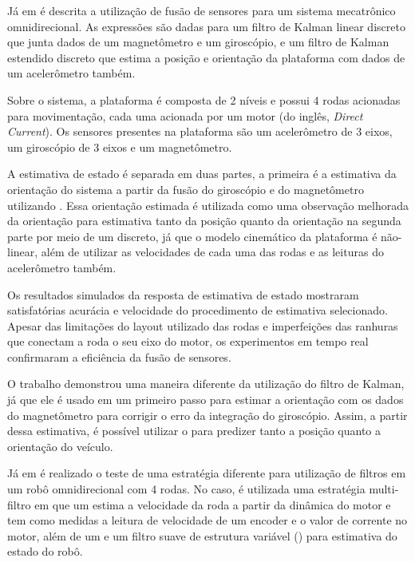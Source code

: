 \documentclass[acronym, symbols, table, deposito]{fei}
\begin{document}
Já em \textcite{korotaj2021kalman} é descrita a utilização de fusão de sensores para um sistema mecatrônico omnidirecional. As expressões são dadas para um filtro de Kalman linear discreto que junta dados de um magnetômetro e um giroscópio, e um filtro de Kalman estendido discreto que estima a posição e orientação da plataforma com dados de um acelerômetro também.

Sobre o sistema, a plataforma é composta de 2 níveis e possui 4 rodas acionadas para movimentação, cada uma acionada por um motor  (do inglês, \textit{Direct Current}). Os sensores presentes na plataforma são um acelerômetro de 3 eixos, um giroscópio de 3 eixos e um magnetômetro.

A estimativa de estado é separada em duas partes, a primeira é a estimativa da orientação do sistema a partir da fusão do giroscópio e do magnetômetro utilizando . Essa orientação estimada é utilizada como uma observação melhorada da orientação para estimativa tanto da posição quanto da orientação na segunda parte por meio de um  discreto, já que o modelo cinemático da plataforma é não-linear, além de utilizar as velocidades de cada uma das rodas e as leituras do acelerômetro também.

Os resultados simulados da resposta de estimativa de estado mostraram satisfatórias acurácia e velocidade do procedimento de estimativa selecionado. Apesar das limitações do layout utilizado das rodas e imperfeições das ranhuras que conectam a roda o seu eixo do motor, os experimentos em tempo real confirmaram a eficiência da fusão de sensores.

O trabalho demonstrou uma maneira diferente da utilização do filtro de Kalman, já que ele é usado em um primeiro passo para estimar a orientação com os dados do magnetômetro para corrigir o erro da integração do giroscópio. Assim, a partir dessa estimativa, é possível utilizar o  para predizer tanto a posição quanto a orientação do veículo.


Já em \textcite{9233826} é realizado o teste de uma estratégia diferente para utilização de filtros em um robô omnidirecional com 4 rodas. No caso, é utilizada uma estratégia multi-filtro em que um  estima a velocidade da roda a partir da dinâmica do motor e tem como medidas a leitura de velocidade de um encoder e o valor de corrente no motor, além de um  e um filtro suave de estrutura variável () para estimativa do estado do robô.
\end{document}
